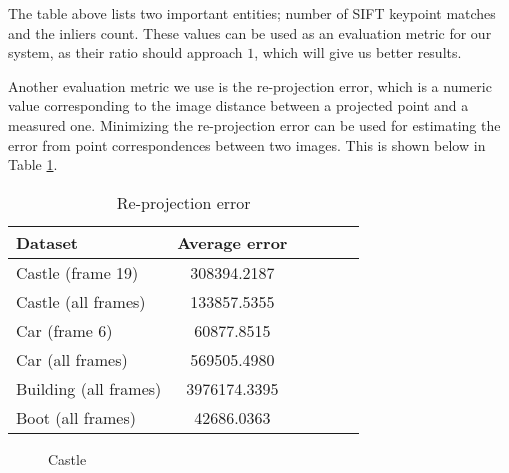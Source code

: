 \documentclass[11pt, a4paper, openany]{article}
\begin{document}
The table above lists two important entities; number of SIFT keypoint matches and the inliers count. These values can be used as an evaluation metric for our system, as their ratio should approach $1$, which will give us better results.

Another evaluation metric we use is the re-projection error, which is a numeric value corresponding to the image distance between a projected point and a measured one. Minimizing the re-projection error can be used for estimating the error from point correspondences between two images. This is shown below in Table \ref{tab:error}.

\begin{table}[H] %
\centering %
\begin{tabular}{l c c c c c} %
\toprule %
Dataset & Average error\\ %
\midrule %
Castle (frame 19) & 308394.2187\\ %
Castle (all frames) & 133857.5355\\ %
Car (frame 6) & 60877.8515\\ %
Car (all frames) & 569505.4980\\ %
Building (all frames) & 3976174.3395\\ %
Boot (all frames) & 42686.0363\\ %
\bottomrule %
\end{tabular}
\caption{Re-projection error} %
\label{tab:error} %
\end{table}

\begin{figure}[H]%
    \centering
    \qquad
    \qquad
    \qquad
    \caption{Castle}%
    \label{fig:castle}%
\end{figure}
\end{document}

